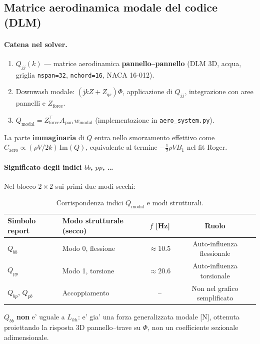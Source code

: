 \documentclass[11pt,a4paper]{article}
\begin{document}
\subsection{Matrice aerodinamica modale del codice (DLM)}

\paragraph{Catena nel solver.}
\begin{enumerate}
  \item $Q_{jj}(k)$ --- matrice aerodinamica \textbf{pannello--pannello} (DLM 3D, acqua,
  griglia \texttt{nspan=32}, \texttt{nchord=16}, NACA 16-012).
  \item Downwash modale: $(\mathrm{j}k Z + Z_{qs})\Phi$, applicazione di $Q_{jj}$, integrazione
  con aree pannelli e $Z_\mathrm{force}$.
  \item $Q_\mathrm{modal} = Z_\mathrm{force}^\top A_\mathrm{pan}\,w_\mathrm{modal}$
  (implementazione in \texttt{aero\_system.py}).
\end{enumerate}
La parte \textbf{immaginaria} di $Q$ entra nello smorzamento effettivo come
$C_\mathrm{aero}\propto (\rho V/2k)\,\mathrm{Im}(Q)$, equivalente al termine $-\tfrac{1}{2}\rho V B_1$
nel fit Roger.

\paragraph{Significato degli indici $bb$, $pp$, \ldots}
Nel blocco $2\times2$ sui primi due modi secchi:

\begin{table}[H]
  \centering
  \caption{Corrispondenza indici $Q_\mathrm{modal}$ e modi strutturali.}
  \label{tab:Q-indices}
  \begin{tabular}{llcc}
    \toprule
    Simbolo report & Modo strutturale (secco) & $f$ [Hz] & Ruolo \\
    \midrule
    $Q_{bb}$ & Modo 0, flessione & $\approx 10.5$ & Auto-influenza flessionale \\
    $Q_{pp}$ & Modo 1, torsione & $\approx 20.6$ & Auto-influenza torsionale \\
    $Q_{bp}$, $Q_{pb}$ & Accoppiamento & -- & Non nel grafico semplificato \\
    \bottomrule
  \end{tabular}
\end{table}

$Q_{bb}$ \textbf{non} e' uguale a $L_{hh}$: e' gia' una forza generalizzata modale
[N], ottenuta proiettando la risposta 3D pannello--trave su $\Phi$, non un coefficiente
sezionale adimensionale.
\end{document}
